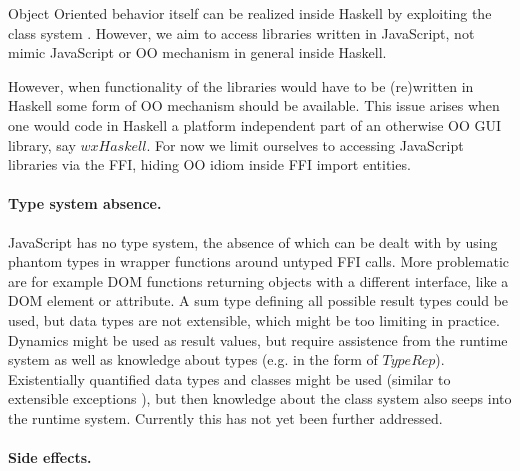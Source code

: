 \documentclass{llncs}
\newcommand{\Conid}[1]{\mathit{#1}}
\newcommand{\Varid}[1]{\mathit{#1}}
\begin{document}
Object Oriented behavior itself can be realized inside Haskell by exploiting the class system
\cite{shields01haskell-oo-overloading,kiselyov05haskell-oo}.
However, we aim to access libraries written in JavaScript, not mimic JavaScript or OO mechanism in general inside Haskell.

However, when functionality of the libraries would have to be (re)written in Haskell some form of OO mechanism
should be available.
This issue arises when one would code in Haskell a platform independent part of an otherwise OO GUI library,
say \ensuremath{\Varid{wxHaskell}}.
For now we limit ourselves to accessing JavaScript libraries via the FFI, hiding OO idiom inside FFI import entities.





\paragraph{Type system absence.}

JavaScript has no type system, the absence of which can be dealt with
by using phantom types in wrapper functions around untyped FFI calls.
More problematic are for example DOM functions returning objects with a different interface,
like a DOM element or attribute.
A sum type defining all possible result types could be used, but data types are not extensible,
which might be too limiting in practice.
Dynamics might be used as result values, but require assistence from the runtime system as well
as knowledge about types (e.g. in the form of \ensuremath{\Conid{TypeRep}}).
Existentially quantified data types and classes might be used (similar to extensible exceptions \cite{marlow06extensible-exception}),
but then knowledge about the class system also seeps into the runtime system.
Currently this has not yet been further addressed.


\paragraph{Side effects.}
\end{document}
